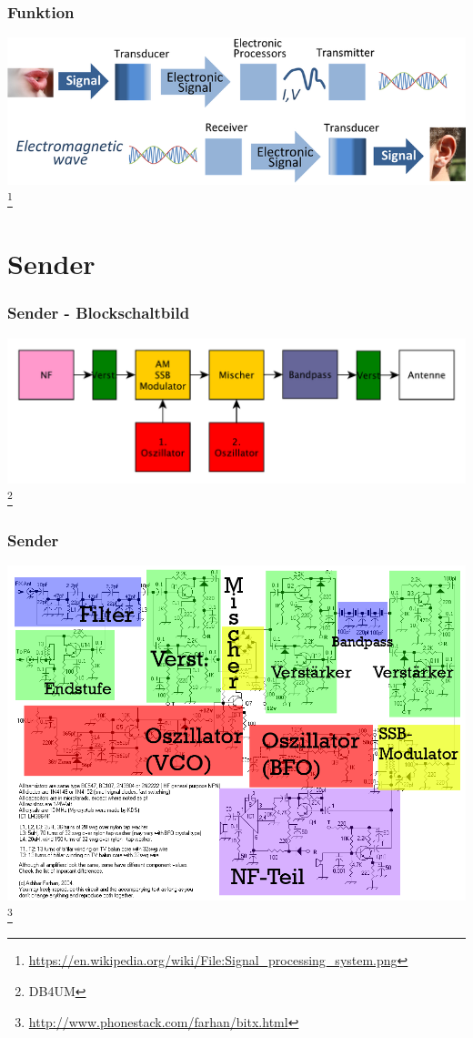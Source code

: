 \begin{frame}
    \frametitle{Funktion}
    \begin{center}
        \includegraphics[width=1\textwidth]{e15/TRX-superSimple.png}
        \footnote{\tiny \url{https://en.wikipedia.org/wiki/File:Signal_processing_system.png}}
	\end{center}
\end{frame}
  
\section*{Sender}

\begin{frame}
    \frametitle{Sender - Blockschaltbild}
    \begin{center}
        \includegraphics[width=1\textwidth]{e15/ssb-trx-bsb.pdf}
        \footnote{\tiny DB4UM}
	\end{center}
\end{frame}

\begin{frame}
    \frametitle{Sender}
    \begin{center}
        \includegraphics[width=.95\textwidth]{e15/bitx-farbe.png}
        \footnote{\tiny \url{http://www.phonestack.com/farhan/bitx.html}}
	\end{center}
\end{frame}

